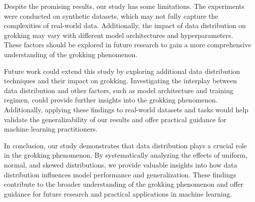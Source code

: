 \documentclass{article} %
\begin{document}
Despite the promising results, our study has some limitations. The experiments were conducted on synthetic datasets, which may not fully capture the complexities of real-world data. Additionally, the impact of data distribution on grokking may vary with different model architectures and hyperparameters. These factors should be explored in future research to gain a more comprehensive understanding of the grokking phenomenon.

Future work could extend this study by exploring additional data distribution techniques and their impact on grokking. Investigating the interplay between data distribution and other factors, such as model architecture and training regimen, could provide further insights into the grokking phenomenon. Additionally, applying these findings to real-world datasets and tasks would help validate the generalizability of our results and offer practical guidance for machine learning practitioners.

In conclusion, our study demonstrates that data distribution plays a crucial role in the grokking phenomenon. By systematically analyzing the effects of uniform, normal, and skewed distributions, we provide valuable insights into how data distribution influences model performance and generalization. These findings contribute to the broader understanding of the grokking phenomenon and offer guidance for future research and practical applications in machine learning.



\end{document}
